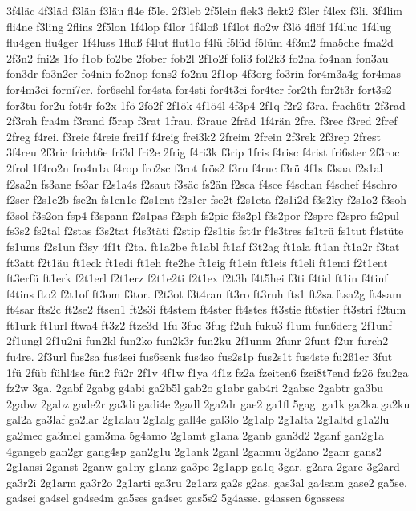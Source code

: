 {3f4läc
4f3läd
f3län
f3läu
fl4e
f5le.
2f3leb
2f5lein
flek3
flekt2
f3ler
f4lex
f3li.
3f4lim
fli4ne
f3ling
2flins
2f5lon
1f4lop
f4lor
1f4loß
1f4lot
flo2w
f3lö
4flöf
1f4luc
1f4lug
flu4gen
flu4ger
1f4luss
1fluß
f4lut
flut1o
f4lü
f5lüd
f5lüm
4f3m2
fma5che
fma2d
2f3n2
fni2s
1fo
f1ob
fo2be
2fober
fob2l
2f1o2f
foli3
fol2k3
fo2na
fo4nan
fon3au
fon3dr
fo3n2er
fo4nin
fo2nop
fons2
fo2nu
2f1op
4f3org
fo3rin
for4m3a4g
for4mas
for4m3ei
forni7er.
for6schl
for4sta
for4sti
for4t3ei
for4ter
for2th
for2t3r
fort3s2
for3tu
for2u
fot4r
fo2x
1fö
2fö2f
2f1ök
4f1ö4l
4f3p4
2f1q
f2r2
f3ra.
frach6tr
2f3rad
2f3rah
fra4m
f3rand
f5rap
f3rat
1frau.
f3rauc
2fräd
1f4rän
2fre.
f3rec
f3red
2fref
2freg
f4rei.
f3reic
f4reie
frei1f
f4reig
frei3k2
2freim
2frein
2f3rek
2f3rep
2frest
3f4reu
2f3ric
fricht6e
fri3d
fri2e
2frig
f4ri3k
f3rip
1fris
f4risc
f4rist
fri6ster
2f3roc
2frol
1f4ro2n
fro4n1a
f4rop
fro2sc
f3rot
frös2
f3ru
f4ruc
f3rü
4f1s
f3saa
f2s1al
f2sa2n
fs3ane
fs3ar
f2s1a4s
f2saut
f3säc
fs2än
f2sca
f4sce
f4schan
f4schef
f4schro
f2scr
f2s1e2b
fse2n
fs1en1e
f2s1ent
f2s1er
fse2t
f2s1eta
f2s1i2d
f3s2ky
f2s1o2
f3soh
f3sol
f3s2on
fsp4
f3spann
f2s1pas
f2sph
fs2pie
f3s2pl
f3s2por
f2spre
f2spro
fs2pul
fs3s2
fs2tal
f2stas
f3s2tat
f4s3täti
f2stip
f2s1tis
fst4r
f4s3tres
fs1trü
fs1tut
f4stüte
fs1ums
f2s1un
f3sy
4f1t
f2ta.
ft1a2be
ft1abl
ft1af
f3t2ag
ft1ala
ft1an
ft1a2r
f3tat
ft3att
f2t1äu
ft1eck
ft1edi
ft1eh
fte2he
ft1eig
ft1ein
ft1eis
ft1eli
ft1emi
f2t1ent
ft3erfü
ft1erk
f2t1erl
f2t1erz
f2t1e2ti
f2t1ex
f2t3h
f4t5hei
f3ti
f4tid
ft1in
f4tinf
f4tins
fto2
f2t1of
ft3om
f3tor.
f2t3ot
f3t4ran
ft3ro
ft3ruh
fts1
ft2sa
ftsa2g
ft4sam
ft4sar
fts2c
ft2se2
ftsen1
ft2s3i
ft4stem
ft4ster
ft4stes
ft3stie
ft6stier
ft3stri
f2tum
ft1urk
ft1url
ftwa4
ft3z2
ftze3d
1fu
3fuc
3fug
f2uh
fuku3
f1um
fun6derg
2f1unf
2f1ungl
2f1u2ni
fun2kl
fun2ko
fun2k3r
fun2ku
2f1unm
2funr
2funt
f2ur
furch2
fu4re.
2f3url
fus2sa
fus4sei
fus6senk
fus4so
fus2s1p
fus2s1t
fus4ste
fu2ß1er
3fut
1fü
2füb
fühl4sc
fün2
fü2r
2f1v
4f1w
f1ya
4f1z
fz2a
fzeiten6
fzei8t7end
fz2ö
fzu2ga
fz2w
3ga.
2gabf
2gabg
g4abi
ga2b5l
gab2o
g1abr
gab4ri
2gabsc
2gabtr
ga3bu
2gabw
2gabz
gade2r
ga3di
gadi4e
2gadl
2ga2dr
gae2
ga1fl
5gag.
ga1k
ga2ka
ga2ku
gal2a
ga3laf
ga2lar
2g1alau
2g1alg
gall4e
gal3lo
2g1alp
2g1alta
2g1altd
g1a2lu
ga2mec
ga3mel
gam3ma
5g4amo
2g1amt
g1ana
2ganb
gan3d2
2ganf
gan2g1a
4gangeb
gan2gr
gang4sp
gan2g1u
2g1ank
2ganl
2ganmu
3g2ano
2ganr
gans2
2g1ansi
2ganst
2ganw
ga1ny
g1anz
ga3pe
2g1app
ga1q
3gar.
g2ara
2garc
3g2ard
ga3r2i
2g1arm
ga3r2o
2g1arti
ga3ru
2g1arz
ga2s
g2as.
gas3al
ga4sam
gase2
ga5se.
ga4sei
ga4sel
ga4se4m
ga5ses
ga4set
gas5s2
5g4asse.
g4assen
6gassess
}
